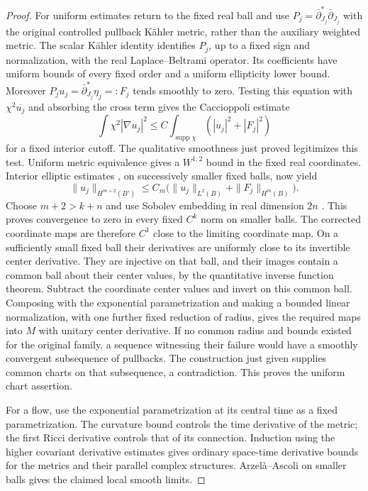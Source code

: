 \documentclass[11pt]{article}
\theoremstyle{definition}
\theoremstyle{remark}
\newcommand{\dbar}{\bar\partial}
\DeclareMathOperator{\supp}{supp}
\numberwithin{equation}{section}
\begin{document}
\begin{proof}
For uniform estimates return to the fixed real ball and use
$P_j=\dbar_{J_j}^*\dbar_{J_j}$ with the original controlled
pullback K\"ahler metric, rather than the auxiliary weighted metric.
The scalar K\"ahler identity identifies $P_j$, up to a fixed sign
and normalization, with the real Laplace--Beltrami operator.
Its coefficients have uniform bounds of every fixed order and a
uniform ellipticity lower bound.  Moreover
$P_ju_j=\dbar_{J_j}^*\eta_j=:F_j$ tends smoothly to zero.
Testing this equation with $\chi^2\overline{u_j}$ and absorbing
the cross term gives the Caccioppoli estimate
\[
 \int\chi^2|\nabla u_j|^2
 \le C\int_{\supp\chi}(|u_j|^2+|F_j|^2)
\]
for a fixed interior cutoff.  The qualitative smoothness just
proved legitimizes this test.  Uniform metric equivalence gives a
$W^{1,2}$ bound in the fixed real coordinates.  Interior elliptic
estimates \cite[Theorems~8.8 and~8.10]{GilbargTrudinger}, on
successively smaller fixed balls, now yield
\[
 \|u_j\|_{H^{m+2}(B')}
 \le C_m\bigl(\|u_j\|_{L^2(B)}+\|F_j\|_{H^m(B)}\bigr).
\]
Choose $m+2>k+n$ and use Sobolev embedding in real dimension $2n$
\cite[Section~5.6.3, Theorem~6]{EvansPDE}.  This proves convergence
to zero in every fixed $C^k$ norm on smaller balls.  The corrected
coordinate maps are therefore $C^1$ close to the limiting coordinate
map.  On a sufficiently small fixed ball their derivatives are
uniformly close to its invertible center derivative.  They are
injective on that ball, and their images contain a common ball about
their center values, by the quantitative inverse function theorem.
Subtract the coordinate center values and invert on this common ball.
Composing with the exponential parametrization and making a bounded
linear normalization, with one further fixed reduction of radius,
gives the required maps into $M$ with unitary center derivative.
If no common radius and bounds existed for the original family, a
sequence witnessing their failure would have a smoothly convergent
subsequence of pullbacks.  The construction just given supplies common
charts on that subsequence, a contradiction.  This proves the uniform
chart assertion.

For a flow, use the exponential parametrization at its central
time as a fixed parametrization.  The curvature bound controls
the time derivative of the metric; the first Ricci derivative
controls that of its connection.  Induction using the higher
covariant derivative estimates gives ordinary space-time
derivative bounds for the metrics and their parallel complex
structures.  Arzel\`a--Ascoli on smaller balls gives the claimed
local smooth limits.
\end{proof}
\end{document}
